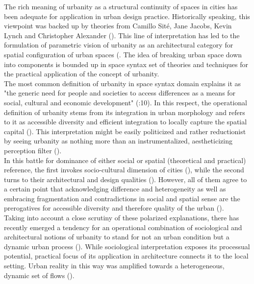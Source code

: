 \documentclass[11pt]{report}
\begin{document}
The rich meaning of urbanity as a structural continuity of spaces in cities has been adequate for application in urban design practice. Historically speaking, this viewpoint was backed up by theories from Camillo Sité, Jane Jacobs, Kevin Lynch and Christopher Alexander (\cite{(Site, Jacobs, Lynch, Alexander)}).
This line of interpretation has led to the formulation of parametric vision of urbanity as an architectural category for spatial configuration of urban spaces (\cite{xxxx}.
The idea of breaking urban space down into components is bounded up in space syntax set of theories and techniques for the practical application of the concept of urbanity.
\\

The most common definition of urbanity in space syntax domain explains it as "the generic need for people and societies to access differences as a means for social, cultural and economic development" (\cite{(Marcus 2007}:10).
In this respect, the operational definition of urbanity stems from its integration in urban morphology  and refers to it as accessible diversity and efficient integration to locally capture the spatial capital (\cite{(Marcus 2007}).
This interpretation might be easily politicized and rather reductionist by seeing urbanity as nothing more than an instrumentalized, aestheticizing perception filter (\cite{(Münkler 1989, Wüst 2005)}).
\\

In this battle for dominance of either social or spatial (theoretical and practical) reference, the first invokes socio-cultural dimension of cities (\cite{Durth 1987, Haussermann and Siebel 1997, Christiaanse 2000}), while the second turns to their architectural and design qualities (\cite{Neuffer 1976}).
However, all of them agree to a certain point that acknowledging difference and heterogeneity as well as embracing fragmentation and contradictions in social and spatial sense are the prerogatives for accessible diversity and therefore quality of the urban (\cite{(Durth 1986: 1838; Herterich, 1988: 273; Krämer-Badoni 1996: 75, Wust 2005, Marcus 2007)}). 
\\

Taking into account a close scrutiny of these polarized explanations, there has recently emerged a tendency for an operational combination of sociological and architectural notions of urbanity to stand for not an urban condition but a dynamic urban process (\cite{(Hortmann 1990)}).
While sociological interpretation exposes its processual potential, practical focus of its application in architecture connects it to the local setting.
Urban reality in this way was amplified towards a heterogeneous, dynamic set of flows (\cite{(de Aguiar 2013)}).
\\
\end{document}
